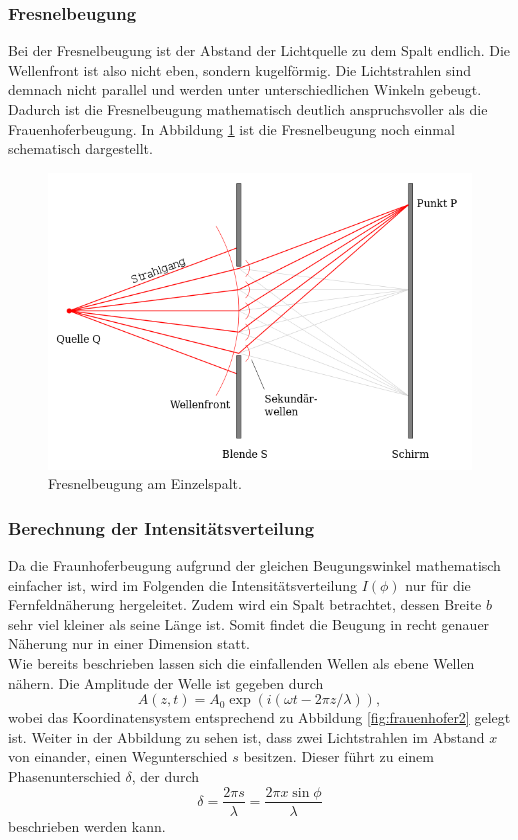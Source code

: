\subsubsection*{Fresnelbeugung}
Bei der Fresnelbeugung ist der Abstand der Lichtquelle zu dem Spalt endlich. Die Wellenfront ist also nicht eben, sondern kugelförmig. Die Lichtstrahlen sind
demnach nicht parallel und werden unter unterschiedlichen Winkeln gebeugt. Dadurch ist die Fresnelbeugung mathematisch deutlich anspruchsvoller als die
Frauenhoferbeugung. In Abbildung \ref{fig:fresnel} ist die Fresnelbeugung noch einmal schematisch dargestellt.
\begin{figure}[H]
    \centering
    \includegraphics[scale = 0.45]{pictures/fresnel.png}
    \caption{Fresnelbeugung am Einzelspalt. \cite{AP02}}
    \label{fig:fresnel}
\end{figure}
\noindent

\subsubsection*{Berechnung der Intensitätsverteilung}
\label{sec:intensität}
Da die Fraunhoferbeugung aufgrund der gleichen Beugungswinkel mathematisch einfacher ist, wird im Folgenden die Intensitätsverteilung $I(\phi)$
nur für die Fernfeldnäherung hergeleitet. Zudem wird ein Spalt betrachtet, dessen Breite $b$ sehr viel kleiner als seine Länge ist. Somit findet
die Beugung in recht genauer Näherung nur in einer Dimension statt.
\\\noindent
Wie bereits beschrieben lassen sich die einfallenden Wellen als ebene Wellen nähern. Die Amplitude der Welle ist gegeben durch
\begin{equation*}
    A(z,t)=A_0\exp{(i(\omega t-2\pi z/\lambda))}    ,
    \label{eqn:ebenewelle}
\end{equation*}
wobei das Koordinatensystem entsprechend zu Abbildung \ref{fig:frauenhofer2} gelegt ist. Weiter in der Abbildung zu sehen ist, dass zwei
Lichtstrahlen im Abstand $x$ von einander, einen Wegunterschied $s$ besitzen. Dieser führt zu einem Phasenunterschied $\delta$, der durch
\begin{equation*}
    \delta=\frac{2\pi s}{\lambda}=\frac{2\pi x \sin{\phi}}{\lambda}
    \label{eqn:phase}
\end{equation*}
beschrieben werden kann.

